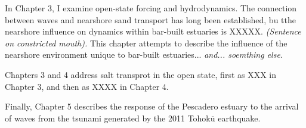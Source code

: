In Chapter 3, I examine open-state forcing and hydrodynamics. The connection between waves and nearshore sand transport has long been established, bu tthe nearshore influence on dynamics within bar-built estuaries is XXXXX. \emph{(Sentence on constricted mouth).} This chapter attempts to describe the influence of the nearshore environment unique to bar-built estuaries... \emph{and... soemthing else}. 

Chapters 3 and 4 address salt transprot in the open state, first as XXX in Chapter 3, and then as XXXX in Chapter 4. 

Finally, Chapter 5 describes the response of the Pescadero estuary to the arrival of waves from the tsunami generated by the 2011 Tohok$\overline{\mathrm{u}}$ earthquake. 
